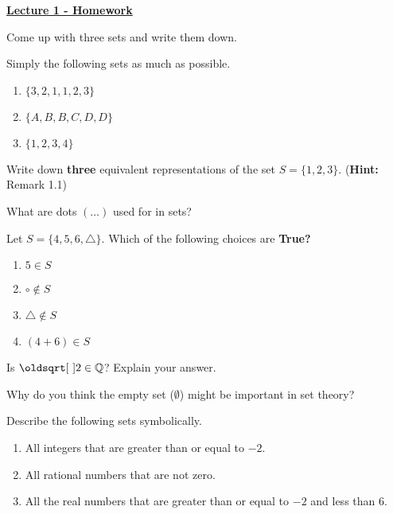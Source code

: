 \documentclass[12pt]{article} %
\begin{document}
\begin{center}
	\textbf{\underline{\Huge{Lecture 1 - Homework}}}
\end{center}
\begin{qstn}
	Come up with three sets and write them down.
\end{qstn}
\begin{qstn}
	Simply the following sets as much as possible.
	\begin{enumerate}[label = (\alph*)]
		\item $ \{3,2,1,1,2,3\} $
		\item $ \{A,B,B,C,D,D\} $
		\item $\{1,2,3,4\} $
	\end{enumerate}
\end{qstn}
\begin{qstn}
	Write down \textbf{three} equivalent representations of the set $S = \{1,2,3\} .$ (\textbf{Hint:} Remark 1.1)
\end{qstn}
\begin{qstn}
	What are dots $(\ldots)$ used for in sets?
\end{qstn}
\begin{qstn}
	Let $S = \{4,5,6,\triangle\} .$ Which of the following choices are \textbf{True?}
	\begin{enumerate}[label = (\alph*)]
		\item $5 \in S$ 
		\item $\circ \not\in S$ 
		\item $\triangle  \not\in  S$ 
		\item $(4 + 6 )\in S$ 
	\end{enumerate}
\end{qstn}
\begin{qstn}
	Is $\sqrt{2} \in \Q$? Explain your answer.
\end{qstn}
\begin{qstn}
	Why do you think the empty set ($\emptyset$) might be important in set theory?
\end{qstn}
\begin{qstn}
	Describe the following sets symbolically.
	\begin{enumerate}[label = (\alph*)]
		\item All integers that are greater than or equal to $-2$.
		\item All rational numbers that are not zero.
		\item All the real numbers that are greater than or equal to $-2$ and less than $6$.
	\end{enumerate}
\end{qstn}
\end{document}
